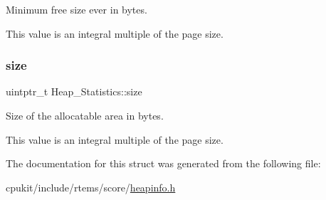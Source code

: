 Minimum free size ever in bytes. 

This value is an integral multiple of the page size. \mbox{\label{structHeap__Statistics_ab98e1923a329bf8fb80326ae6a4ee6be}} 
\subsubsection{\texorpdfstring{size}{size}}
{\footnotesize\ttfamily uintptr\+\_\+t Heap\+\_\+\+Statistics\+::size}



Size of the allocatable area in bytes. 

This value is an integral multiple of the page size. 

The documentation for this struct was generated from the following file\+:\begin{DoxyCompactItemize}
\item 
cpukit/include/rtems/score/\mbox{\hyperlink{heapinfo_8h}{heapinfo.\+h}}\end{DoxyCompactItemize}
